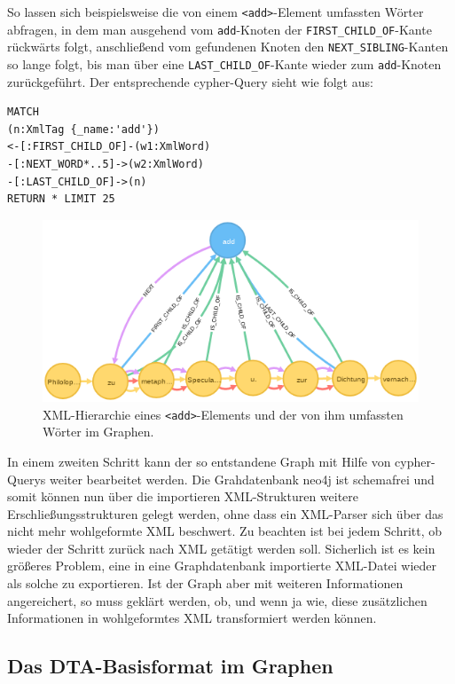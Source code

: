 So lassen sich beispielsweise die von einem
\texttt{\textless{}add\textgreater{}}-Element umfassten Wörter abfragen,
in dem man ausgehend vom \texttt{add}-Knoten der
\texttt{FIRST\_CHILD\_OF}-Kante rückwärts folgt, anschließend vom
gefundenen Knoten den \texttt{NEXT\_SIBLING}-Kanten so lange folgt, bis
man über eine \texttt{LAST\_CHILD\_OF}-Kante wieder zum
\texttt{add}-Knoten zurückgeführt. Der entsprechende cypher-Query sieht
wie folgt aus:

\begin{verbatim}
MATCH
(n:XmlTag {_name:'add'})
<-[:FIRST_CHILD_OF]-(w1:XmlWord)
-[:NEXT_WORD*..5]->(w2:XmlWord)
-[:LAST_CHILD_OF]->(n)
RETURN * LIMIT 25
\end{verbatim}

\begin{figure}
\centering
\includegraphics{Bilder/TEI2Graph/XML-Hierarchie.png}
\caption{XML-Hierarchie eines
\texttt{\textless{}add\textgreater{}}-Elements und der von ihm umfassten
Wörter im Graphen.}
\end{figure}

In einem zweiten Schritt kann der so entstandene Graph mit Hilfe von
cypher-Querys weiter bearbeitet werden. Die Grahdatenbank neo4j ist
schemafrei und somit können nun über die importieren XML-Strukturen
weitere Erschließungsstrukturen gelegt werden, ohne dass ein XML-Parser
sich über das nicht mehr wohlgeformte XML beschwert. Zu beachten ist bei
jedem Schritt, ob wieder der Schritt zurück nach XML getätigt werden
soll. Sicherlich ist es kein größeres Problem, eine in eine
Graphdatenbank importierte XML-Datei wieder als solche zu exportieren.
Ist der Graph aber mit weiteren Informationen angereichert, so muss
geklärt werden, ob, und wenn ja wie, diese zusätzlichen Informationen in
wohlgeformtes XML transformiert werden können.

\hypertarget{das-dta-basisformat-im-graphen}{%
\subsection{Das DTA-Basisformat im
Graphen}\label{das-dta-basisformat-im-graphen}}

